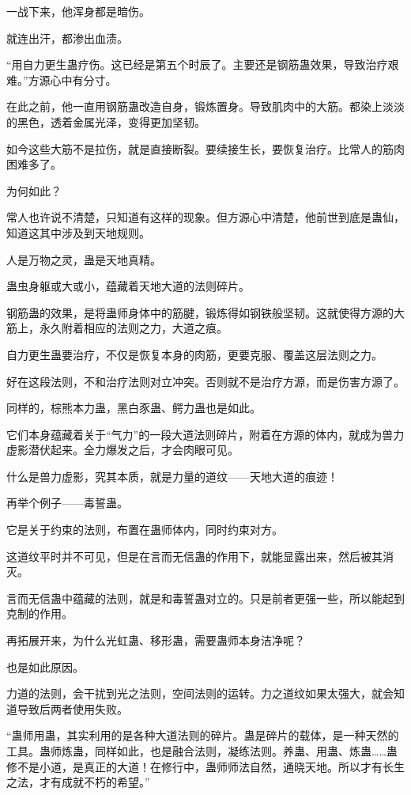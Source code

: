 \begin{this_body}
一战下来，他浑身都是暗伤。

就连出汗，都渗出血渍。

“用自力更生蛊疗伤。这已经是第五个时辰了。主要还是钢筋蛊效果，导致治疗艰难。”方源心中有分寸。

在此之前，他一直用钢筋蛊改造自身，锻炼置身。导致肌肉中的大筋。都染上淡淡的黑色，透着金属光泽，变得更加坚韧。

如今这些大筋不是拉伤，就是直接断裂。要续接生长，要恢复治疗。比常人的筋肉困难多了。

为何如此？

常人也许说不清楚，只知道有这样的现象。但方源心中清楚，他前世到底是蛊仙，知道这其中涉及到天地规则。

人是万物之灵，蛊是天地真精。

蛊虫身躯或大或小，蕴藏着天地大道的法则碎片。

钢筋蛊的效果，是将蛊师身体中的筋腱，锻炼得如钢铁般坚韧。这就使得方源的大筋上，永久附着相应的法则之力，大道之痕。

自力更生蛊要治疗，不仅是恢复本身的肉筋，更要克服、覆盖这层法则之力。

好在这段法则，不和治疗法则对立冲突。否则就不是治疗方源，而是伤害方源了。

同样的，棕熊本力蛊，黑白豕蛊、鳄力蛊也是如此。

它们本身蕴藏着关于“气力”的一段大道法则碎片，附着在方源的体内，就成为兽力虚影潜伏起来。全力爆发之后，才会肉眼可见。

什么是兽力虚影，究其本质，就是力量的道纹——天地大道的痕迹！

再举个例子——毒誓蛊。

它是关于约束的法则，布置在蛊师体内，同时约束对方。

这道纹平时并不可见，但是在言而无信蛊的作用下，就能显露出来，然后被其消灭。

言而无信蛊中蕴藏的法则，就是和毒誓蛊对立的。只是前者更强一些，所以能起到克制的作用。

再拓展开来，为什么光虹蛊、移形蛊，需要蛊师本身洁净呢？

也是如此原因。

力道的法则，会干扰到光之法则，空间法则的运转。力之道纹如果太强大，就会知道导致后两者使用失败。

“蛊师用蛊，其实利用的是各种大道法则的碎片。蛊是碎片的载体，是一种天然的工具。蛊师炼蛊，同样如此，也是融合法则，凝练法则。养蛊、用蛊、炼蛊……蛊修不是小道，是真正的大道！在修行中，蛊师师法自然，通晓天地。所以才有长生之法，才有成就不朽的希望。”


\end{this_body}
